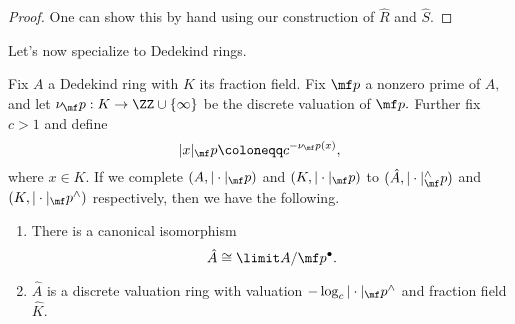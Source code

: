 \documentclass[../notes.tex]{subfiles}
\begin{document}
\begin{proof}
	One can show this by hand using our construction of $\hat R$ and $\hat S.$
\end{proof}
Let's now specialize to Dedekind rings.
\begin{proposition}
	Fix $A$ a Dedekind ring with $K$ its fraction field. Fix $\mf p$ a nonzero prime of $A,$ and let $\nu_\mf p:K\to\ZZ\cup\{\infty\}$ be the discrete valuation of $\mf p.$ Further fix $c>1$ and define
	\[|x|_\mf p\coloneqq c^{-\nu_\mf p(x)},\]
	where $x\in K.$ If we complete $(A,|\cdot|_\mf p)$ and $(K,|\cdot|_\mf p)$ to $(\hat A,|\cdot|^\wedge_\mf p)$ and $(K,|\cdot|_\mf p^\wedge)$ respectively, then we have the following.
	\begin{enumerate}[label=(\alph*)]
		\item There is a canonical isomorphism
		\[\hat A\cong\limit A/\mf p^\bullet.\]
		\item $\hat A$ is a discrete valuation ring with valuation $-\log_c|\cdot|_\mf p^\wedge$ and fraction field $\hat K.$
	\end{enumerate}
\end{proposition}
\end{document}
